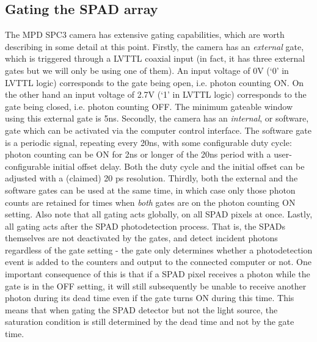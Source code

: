 \documentclass[]{article}
\begin{document}
\subsection{Gating the SPAD array}
	The MPD SPC3 camera has extensive gating capabilities, which are worth describing in some detail at this point. Firstly, the camera has an \textit{external} gate, which is triggered through a LVTTL coaxial input (in fact, it has three external gates but we will only be using one of them). An input voltage of 0V (`0' in LVTTL logic) corresponds to the gate being open, i.e. photon counting ON. On the other hand an input voltage of 2.7V (`1' in LVTTL logic) corresponds to the gate being closed, i.e. photon counting OFF. The minimum gateable window using this external gate is 5ns. Secondly, the camera has an \textit{internal}, or software, gate which can be activated via the computer control interface. The software gate is a periodic signal, repeating every 20ns, with some configurable duty cycle: photon counting can be ON for 2ns or longer of the 20ns period with a user-configurable initial offset delay. Both the duty cycle and the initial offset can be adjusted with a (claimed) 20 ps resolution. Thirdly, both the external and the software gates can be used at the same time, in which case only those photon counts are retained for times when \textit{both} gates are on the photon counting ON setting. Also note that all gating acts globally, on all SPAD pixels at once. Lastly, all gating acts after the SPAD photodetection process. That is, the SPADs themselves are not deactivated by the gates, and detect incident photons regardless of the gate setting - the gate only determines whether a photodetection event is added to the counters and output to the connected computer or not. One important consequence of this is that if a SPAD pixel receives a photon while the gate is in the OFF setting, it will still subsequently be unable to receive another photon during its dead time even if the gate turns ON during this time. This means that when gating the SPAD detector but not the light source, the saturation condition is still determined by the dead time and not by the gate time.
	
\end{document}
